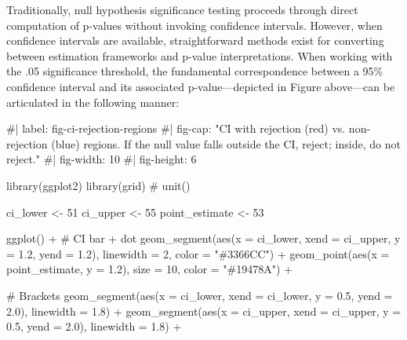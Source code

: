 \documentclass[
  letterpaper,
  DIV=11,
  numbers=noendperiod]{scrreprt}
\newenvironment{Shaded}{\begin{snugshade}}{\end{snugshade}}
\newcommand{\AttributeTok}[1]{\textcolor[rgb]{0.40,0.45,0.13}{#1}}
\newcommand{\CommentTok}[1]{\textcolor[rgb]{0.37,0.37,0.37}{#1}}
\newcommand{\DecValTok}[1]{\textcolor[rgb]{0.68,0.00,0.00}{#1}}
\newcommand{\FloatTok}[1]{\textcolor[rgb]{0.68,0.00,0.00}{#1}}
\newcommand{\FunctionTok}[1]{\textcolor[rgb]{0.28,0.35,0.67}{#1}}
\newcommand{\NormalTok}[1]{\textcolor[rgb]{0.00,0.23,0.31}{#1}}
\newcommand{\OtherTok}[1]{\textcolor[rgb]{0.00,0.23,0.31}{#1}}
\newcommand{\SpecialCharTok}[1]{\textcolor[rgb]{0.37,0.37,0.37}{#1}}
\newcommand{\StringTok}[1]{\textcolor[rgb]{0.13,0.47,0.30}{#1}}
\begin{document}
Traditionally, null hypothesis significance testing proceeds through
direct computation of p-values without invoking confidence intervals.
However, when confidence intervals are available, straightforward
methods exist for converting between estimation frameworks and p-value
interpretations. When working with the .05 significance threshold, the
fundamental correspondence between a 95\% confidence interval and its
associated p-value---depicted in Figure above---can be articulated in
the following manner:

\begin{Shaded}
\begin{Highlighting}[]
\CommentTok{\#| label: fig{-}ci{-}rejection{-}regions}
\CommentTok{\#| fig{-}cap: "CI with rejection (red) vs. non{-}rejection (blue) regions. If the null value falls outside the CI, reject; inside, do not reject."}
\CommentTok{\#| fig{-}width: 10}
\CommentTok{\#| fig{-}height: 6}

\FunctionTok{library}\NormalTok{(ggplot2)}
\FunctionTok{library}\NormalTok{(grid)  }\CommentTok{\# unit()}

\NormalTok{ci\_lower }\OtherTok{\textless{}{-}} \DecValTok{51}
\NormalTok{ci\_upper }\OtherTok{\textless{}{-}} \DecValTok{55}
\NormalTok{point\_estimate }\OtherTok{\textless{}{-}} \DecValTok{53}

\FunctionTok{ggplot}\NormalTok{() }\SpecialCharTok{+}
  \CommentTok{\# CI bar + dot}
  \FunctionTok{geom\_segment}\NormalTok{(}\FunctionTok{aes}\NormalTok{(}\AttributeTok{x =}\NormalTok{ ci\_lower, }\AttributeTok{xend =}\NormalTok{ ci\_upper, }\AttributeTok{y =} \FloatTok{1.2}\NormalTok{, }\AttributeTok{yend =} \FloatTok{1.2}\NormalTok{),}
               \AttributeTok{linewidth =} \DecValTok{2}\NormalTok{, }\AttributeTok{color =} \StringTok{"\#3366CC"}\NormalTok{) }\SpecialCharTok{+}
  \FunctionTok{geom\_point}\NormalTok{(}\FunctionTok{aes}\NormalTok{(}\AttributeTok{x =}\NormalTok{ point\_estimate, }\AttributeTok{y =} \FloatTok{1.2}\NormalTok{), }\AttributeTok{size =} \DecValTok{10}\NormalTok{, }\AttributeTok{color =} \StringTok{"\#19478A"}\NormalTok{) }\SpecialCharTok{+}

  \CommentTok{\# Brackets}
  \FunctionTok{geom\_segment}\NormalTok{(}\FunctionTok{aes}\NormalTok{(}\AttributeTok{x =}\NormalTok{ ci\_lower, }\AttributeTok{xend =}\NormalTok{ ci\_lower, }\AttributeTok{y =} \FloatTok{0.5}\NormalTok{, }\AttributeTok{yend =} \FloatTok{2.0}\NormalTok{), }\AttributeTok{linewidth =} \FloatTok{1.8}\NormalTok{) }\SpecialCharTok{+}
  \FunctionTok{geom\_segment}\NormalTok{(}\FunctionTok{aes}\NormalTok{(}\AttributeTok{x =}\NormalTok{ ci\_upper, }\AttributeTok{xend =}\NormalTok{ ci\_upper, }\AttributeTok{y =} \FloatTok{0.5}\NormalTok{, }\AttributeTok{yend =} \FloatTok{2.0}\NormalTok{), }\AttributeTok{linewidth =} \FloatTok{1.8}\NormalTok{) }\SpecialCharTok{+}


\end{Highlighting}
\end{Shaded}
\end{document}
